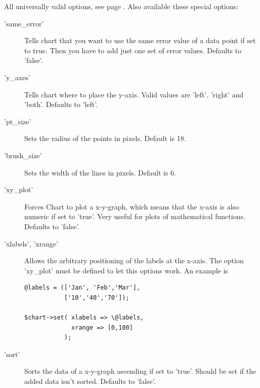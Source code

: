 \Attributes
All universally valid options, see page \pageref{options}. Also available these special options:
\begin{description}
\item['same\_error'] Tells chart that you want to use the same error value of a data point 
     if set to true. 
     Then you have to add just one set of error values. Defaults to 'false'.
     
\item['y\_axes'] Tells chart where to place the y-axis. 
     Valid values are 'left', 'right' and 'both'. Defaults to 'left'.

\item['pt\_size']Sets the radius of the points in pixels. Default is 18.

\item['brush\_size']Sets the width of the lines in pixels. Default is 6.

\item['xy\_plot']Forces Chart to plot a x-y-graph, 
      which means that the x-axis is also numeric if set to 'true'. 
      Very useful for plots of mathematical functions. Defaults to 'false'.

\item['xlabels', 'xrange'] Allows the arbitrary positioning of the labels at the
                  x-axis. The option 'xy\_plot' must be defined to let this
                  options work. An example is
                  \begin{verbatim}
@labels = (['Jan', 'Feb','Mar'], 
           ['10','40','70']); 

$chart->set( xlabels => \@labels, 
             xrange => [0,100] 
           ); 
                   \end{verbatim}


\item['sort']Sorts the data of a x-y-graph ascending if set to 'true'. 
      Should be set if the added data isn't sorted. Defaults to 'false'. 
\end{description}
